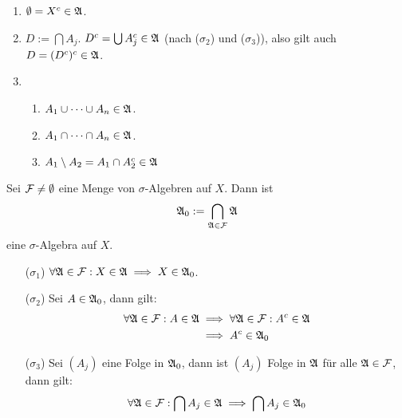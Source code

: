 \begin{beweis}
    \begin{enumerate}
    \item {} $\emptyset=X^c\in\mathfrak{A}$.
    \item $D:=\bigcap A_j$. $D^c=\bigcup A_j^c\in\mathfrak{A}$ (nach 
          ($\sigma_2$) und ($\sigma_3$)), also gilt auch 
          $D=(D^c)^c\in\mathfrak{A}$.
    \item \begin{enumerate}
            \item {} 
                  $A_1\cup\dots\cup A_n\in\mathfrak{A}$.
            \item {} 
                  $A_1\cap\dots\cap A_n\in\mathfrak{A}$.
            \item $A_1\setminus A_2=A_1\cap A_2^c\in\mathfrak{A}$
          \end{enumerate}
    \end{enumerate}
\end{beweis}

\begin{lemma}
    \label{Lemma 1.2}
    Sei $\mathcal{F} \neq \emptyset$ eine Menge von $\sigma$-Algebren auf $X$. 
    Dann ist 
    \[\mathfrak{A}_0:=\bigcap_{\mathfrak{A}\in\mathcal{F}}\mathfrak{A}\]
    eine $\sigma$-Algebra auf $X$.
\end{lemma}

\begin{beweis}
    \begin{enumerate}
        \item[($\sigma_1$)] $\forall\mathfrak{A}\in\mathcal{F}:X\in\mathfrak{A}\implies X\in\mathfrak{A}_0$.
        \item[($\sigma_2$)] Sei $A\in\mathfrak{A}_0$, dann gilt:
          \begin{align*}
            \forall\mathfrak{A}\in\mathcal{F}:A\in\mathfrak{A} &\implies \forall\mathfrak{A}\in\mathcal{F}:A^c\in\mathfrak{A}\\
                                     &\implies A^c\in\mathfrak{A}_0
          \end{align*}
        \item[($\sigma_3$)] Sei $(A_j)$ eine Folge in $\mathfrak{A}_0$, dann 
            ist $(A_j)$ Folge in $\mathfrak{A}$ für alle $\mathfrak{A}\in\mathcal{F}$, dann gilt:
          \begin{align*}
            \forall\mathfrak{A}\in\mathcal{F}:\bigcap A_j\in\mathfrak{A} \implies \bigcap A_j\in\mathfrak{A}_0
          \end{align*}
    \end{enumerate}
\end{beweis}


